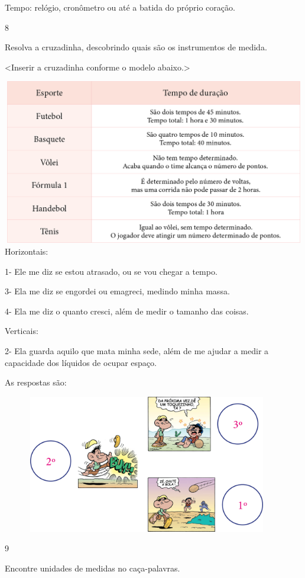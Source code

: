 {Tempo: relógio, cronômetro ou até a batida do próprio coração.

\num{8}

Resolva a cruzadinha, descobrindo quais são os instrumentos de medida.

\textless{}Inserir a cruzadinha conforme o modelo abaixo.\textgreater{}

\includegraphics[width=6.14865in,height=2.84375in]{media/image48.png}Horizontais:

1- Ele me diz se estou atrasado, ou se vou chegar a tempo.

3- Ela me diz se engordei ou emagreci, medindo minha massa.

4- Ela me diz o quanto cresci, além de medir o tamanho das coisas.

Verticais:

2- Ela guarda aquilo que mata minha sede, além de me ajudar a medir a
capacidade dos líquidos de ocupar espaço.

As respostas são:

\includegraphics[width=5.00000in,height=2.37500in]{media/image49.png}

\num{9}

Encontre unidades de medidas no caça-palavras.

}
